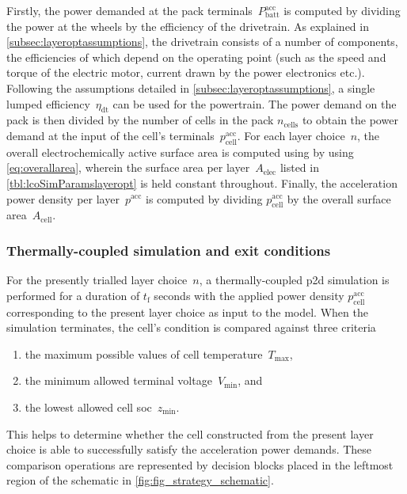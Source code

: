 Firstly, the power demanded  at the pack terminals~$P^\text{acc}_\text{batt}$ is
computed  by  dividing  the  power  at  the wheels  by  the  efficiency  of  the
drivetrain.  As explained  in \cref{subsec:layeroptassumptions},  the drivetrain
consists of  a number  of components,  the efficiencies of  which depend  on the
operating point  (such as the  speed and torque  of the electric  motor, current
drawn  by the  power electronics  etc.). Following  the assumptions  detailed in
\cref{subsec:layeroptassumptions},  a single  lumped efficiency~$\eta_\text{dt}$
can be  used for the powertrain.  The power demand  on the pack is  then divided
by  the  number of  cells  in  the pack  $n_\text{cells}$  to  obtain the  power
demand  at the  input  of the  cell's terminals~$p^\text{acc}_\text{cell}$.  For
each  layer choice~$n$,  the overall  electrochemically active  surface area  is
computed  using by  using \cref{eq:overallarea},  wherein the  surface area  per
layer~$A_\text{elec}$ listed in \cref{tbl:lcoSimParamslayeropt} is held constant
throughout.  Finally, the  acceleration power  density per  layer~$p^\text{acc}$
is  computed  by  dividing  $p^\text{acc}_\text{cell}$ by  the  overall  surface
area~$A_\text{cell}$.

\subsubsection*{Thermally-coupled  simulation and exit
conditions}\label{sec:accexitconditions}

For  the  presently trialled  layer  choice~$n$,  a thermally-coupled  \gls{p2d}
simulation is performed for a duration  of $t_\text{f}$ seconds with the applied
power  density $p^\text{acc}_\text{cell}$  corresponding  to  the present  layer
choice  as input  to  the  model. When  the  simulation  terminates, the  cell's
condition is compared against three criteria
\begin{enumerate}
    \item the maximum possible values of cell temperature~$T_\text{max}$,
    \item the minimum allowed terminal voltage~$V_\text{min}$, and
    \item the lowest allowed cell \gls{soc}~$z_\text{min}$.
\end{enumerate}
This helps  to determine  whether the  cell constructed  from the  present layer
choice is  able to  successfully satisfy the  acceleration power  demands. These
comparison operations are represented by  decision blocks placed in the leftmost
region of the schematic in \cref{fig:fig_strategy_schematic}.

